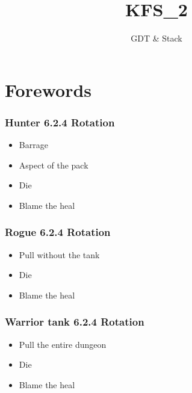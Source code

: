 \documentclass{42-en}
\begin{document}
                           \title{KFS\_2}
                          \subtitle{GDT \& Stack}


\maketitle

\tableofcontents

\newpage
\chapter{Forewords}
	\subsection{Hunter 6.2.4 Rotation}
		\begin{itemize}\itemsep1pt
			\item Barrage
			\item Aspect of the pack
			\item Die
			\item Blame the heal
		\end{itemize}
	\subsection{Rogue 6.2.4 Rotation}
		\begin{itemize}\itemsep1pt
			\item Pull without the tank
			\item Die
			\item Blame the heal
		\end{itemize}
	\subsection{Warrior tank 6.2.4 Rotation}
		\begin{itemize}\itemsep1pt
			\item Pull the entire dungeon
			\item Die
			\item Blame the heal
		\end{itemize}
\end{document}
